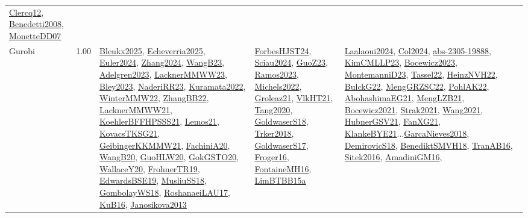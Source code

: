 {\begin{longtable}{p{3cm}r>{\raggedright\arraybackslash}p{6cm}>{\raggedright\arraybackslash}p{6cm}>{\raggedright\arraybackslash}p{8cm}}
\hyperref[detail:Clercq12]{Clercq12}, \hyperref[detail:Benedetti2008]{Benedetti2008}, \hyperref[detail:MonetteDD07]{MonetteDD07}\\
\index{Gurobi}\index{CPSystems!Gurobi}Gurobi &  1.00 & \hyperref[detail:Bleukx2025]{Bleukx2025}, \hyperref[detail:Echeverria2025]{Echeverria2025}, \hyperref[detail:Euler2024]{Euler2024}, \hyperref[detail:Zhang2024]{Zhang2024}, \hyperref[detail:WangB23]{WangB23}, \hyperref[detail:Adelgren2023]{Adelgren2023}, \hyperref[detail:LacknerMMWW23]{LacknerMMWW23}, \hyperref[detail:Bley2023]{Bley2023}, \hyperref[detail:NaderiRR23]{NaderiRR23}, \hyperref[detail:Kuramata2022]{Kuramata2022}, \hyperref[detail:WinterMMW22]{WinterMMW22}, \hyperref[detail:ZhangBB22]{ZhangBB22}, \hyperref[detail:LacknerMMWW21]{LacknerMMWW21}, \hyperref[detail:KoehlerBFFHPSSS21]{KoehlerBFFHPSSS21}, \hyperref[detail:Lemos21]{Lemos21}, \hyperref[detail:KovacsTKSG21]{KovacsTKSG21}, \hyperref[detail:GeibingerKKMMW21]{GeibingerKKMMW21}, \hyperref[detail:FachiniA20]{FachiniA20}, \hyperref[detail:WangB20]{WangB20}, \hyperref[detail:GuoHLW20]{GuoHLW20}, \hyperref[detail:GokGSTO20]{GokGSTO20}, \hyperref[detail:WallaceY20]{WallaceY20}, \hyperref[detail:FrohnerTR19]{FrohnerTR19}, \hyperref[detail:EdwardsBSE19]{EdwardsBSE19}, \hyperref[detail:MusliuSS18]{MusliuSS18}, \hyperref[detail:GombolayWS18]{GombolayWS18}, \hyperref[detail:RoshanaeiLAU17]{RoshanaeiLAU17}, \hyperref[detail:KuB16]{KuB16}, \hyperref[detail:Janosikova2013]{Janosikova2013} & \hyperref[detail:ForbesHJST24]{ForbesHJST24}, \hyperref[detail:Sciau2024]{Sciau2024}, \hyperref[detail:GuoZ23]{GuoZ23}, \hyperref[detail:Ramos2023]{Ramos2023}, \hyperref[detail:Michels2022]{Michels2022}, \hyperref[detail:Groleaz21]{Groleaz21}, \hyperref[detail:VlkHT21]{VlkHT21}, \hyperref[detail:Tang2020]{Tang2020}, \hyperref[detail:GoldwaserS18]{GoldwaserS18}, \hyperref[detail:Trker2018]{Trker2018}, \hyperref[detail:GoldwaserS17]{GoldwaserS17}, \hyperref[detail:Froger16]{Froger16}, \hyperref[detail:FontaineMH16]{FontaineMH16}, \hyperref[detail:LimBTBB15a]{LimBTBB15a} & \hyperref[detail:Laalaoui2024]{Laalaoui2024}, \hyperref[detail:Col2024]{Col2024}, \hyperref[detail:abs-2305-19888]{abs-2305-19888}, \hyperref[detail:KimCMLLP23]{KimCMLLP23}, \hyperref[detail:Bocewicz2023]{Bocewicz2023}, \hyperref[detail:MontemanniD23]{MontemanniD23}, \hyperref[detail:Tassel22]{Tassel22}, \hyperref[detail:HeinzNVH22]{HeinzNVH22}, \hyperref[detail:BulckG22]{BulckG22}, \hyperref[detail:MengGRZSC22]{MengGRZSC22}, \hyperref[detail:PohlAK22]{PohlAK22}, \hyperref[detail:AbohashimaEG21]{AbohashimaEG21}, \hyperref[detail:MengLZB21]{MengLZB21}, \hyperref[detail:Bocewicz2021]{Bocewicz2021}, \hyperref[detail:Strak2021]{Strak2021}, \hyperref[detail:Wang2021]{Wang2021}, \hyperref[detail:HubnerGSV21]{HubnerGSV21}, \hyperref[detail:FanXG21]{FanXG21}, \hyperref[detail:KlankeBYE21]{KlankeBYE21}...\hyperref[detail:GarcaNieves2018]{GarcaNieves2018}, \hyperref[detail:DemirovicS18]{DemirovicS18}, \hyperref[detail:BenediktSMVH18]{BenediktSMVH18}, \hyperref[detail:TranAB16]{TranAB16}, \hyperref[detail:Sitek2016]{Sitek2016}, \hyperref[detail:AmadiniGM16]{AmadiniGM16}, 
\end{longtable}}
